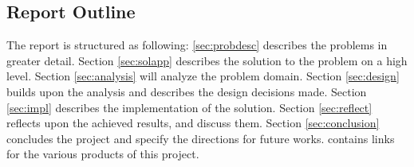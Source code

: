 \subsection{Report Outline}
The report is structured as following: \autoref{sec:probdesc} describes the problems in greater detail. Section \ref{sec:solapp} describes the solution to the problem on a high level. Section \ref{sec:analysis} will analyze the problem domain. Section \ref{sec:design} builds upon the analysis and describes the design decisions made. Section \ref{sec:impl} describes the implementation of the solution. Section \ref{sec:reflect} reflects upon the achieved results, and discuss them. Section \ref{sec:conclusion} concludes the project and specify the directions for future works.  contains links for the various products of this project.